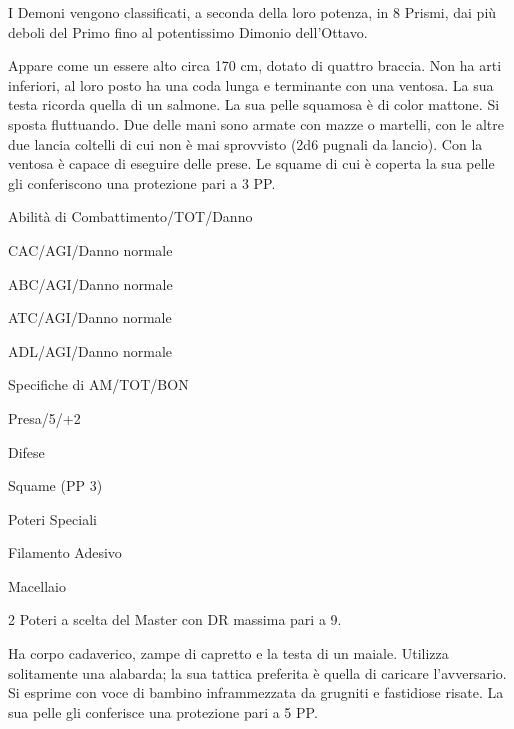 I Demoni vengono classificati, a seconda della loro potenza, in 8
Prismi, dai pi\`u deboli del Primo fino al potentissimo Dimonio
dell'Ottavo.



Appare come un essere alto circa 170 cm, dotato di quattro braccia.
Non ha arti inferiori, al loro posto ha una coda lunga e terminante
con una ventosa. La sua testa ricorda quella di un salmone. La sua
pelle squamosa \`e di color mattone.  Si sposta fluttuando.  Due delle
mani sono armate con mazze o martelli, con le altre due lancia
coltelli di cui non \`e mai sprovvisto (2d6 pugnali da lancio). Con la
ventosa \`e capace di eseguire delle prese. Le squame di cui \`e
coperta la sua pelle gli conferiscono una protezione pari a 3 PP.


\begin{parmostro}{Abilit\`a di Combattimento/TOT/Danno}
\item CAC/AGI/Danno normale 
\item ABC/AGI/Danno normale 
\item ATC/AGI/Danno normale 
\item ADL/AGI/Danno normale
\end{parmostro}

\begin{parmostro}{Specifiche di AM/TOT/BON} 
\item Presa/5/+2
\end{parmostro}

\begin{parmostro}{Difese} 
\item Squame (PP 3)
\end{parmostro}

\begin{parmostro}{Poteri Speciali} 
\item Filamento Adesivo 
\item Macellaio 
\item 2 Poteri a scelta del Master con DR massima pari a 9.
\end{parmostro}


Ha corpo cadaverico, zampe di capretto e la testa di un maiale. Utilizza solitamente
una alabarda; la sua tattica preferita \`e quella di caricare l'avversario.
Si esprime con voce di bambino inframmezzata da grugniti e fastidiose risate.
La sua pelle gli conferisce una protezione pari a 5 PP. 

